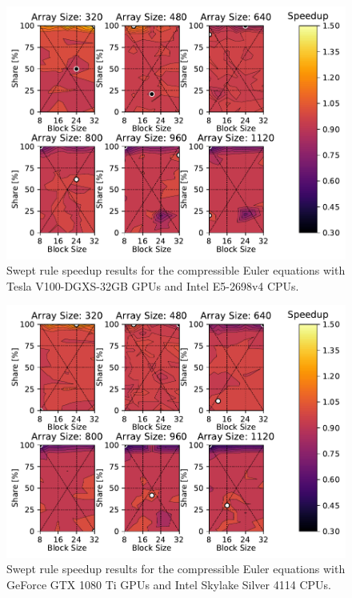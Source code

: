 \documentclass[mca,article,submit,moreauthors,pdftex]{Definitions/mdpi}
\def\oldCPU{Intel Skylake Silver 4114} %
\def\oldGPU{GeForce GTX 1080 Ti}
\def\newCPU{Intel E5-2698v4} %
\def\newGPU{Tesla V100-DGXS-32GB}
\begin{document}
\begin{figure}[htbp]
\widefigure
    \includegraphics[scale=0.85]{figs/speedUpeulerNew.pdf}
    \caption{Swept rule speedup results  for the compressible Euler equations with \newGPU{} GPUs and \newCPU{} CPUs.}
    \label{fig:newSpeedupEuler}
\end{figure}
\begin{paracol}{2}
\linenumbers
\switchcolumn

\end{paracol}
\nointerlineskip

\begin{figure}[htbp]
    \widefigure
    \includegraphics[scale=0.85]{figs/speedUpeulerOld.pdf}
    \caption{Swept rule speedup results  for the compressible Euler equations with \oldGPU{} GPUs and \oldCPU{} CPUs.}
    \label{fig:oldSpeedupEuler}
\end{figure}
\begin{paracol}{2}
\linenumbers
\switchcolumn

\end{paracol}
\nointerlineskip
\end{document}
